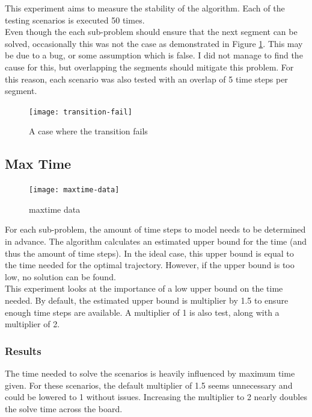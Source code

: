 This experiment aims to measure the stability of the algorithm. Each of the testing scenarios is executed 50 times. \\

Even though the each sub-problem should ensure that the next segment can be solved, occasionally this was not the case as demonstrated in Figure \ref{fig:transition-fail}. This may be due to a bug, or some assumption which is false. I did not manage to find the cause for this, but overlapping the segments should mitigate this problem. For this reason, each scenario was also tested with an overlap of 5 time steps per segment.
\begin{figure}[]
	\centering
	\texttt{[image: transition-fail]}
	\caption{A case where the transition fails}
	\label{fig:transition-fail}
\end{figure}




\clearpage
\subsection{Max Time}
\begin{figure}[]
	\centering
	\texttt{[image: maxtime-data]}
	\caption{maxtime data}
	\label{fig:maxtime-data}
\end{figure}
For each sub-problem, the amount of time steps to model needs to be determined in advance. The algorithm calculates an estimated upper bound for the time (and thus the amount of time steps). In the ideal case, this upper bound is equal to the time needed for the optimal trajectory. However, if the upper bound is too low, no solution can be found.\\

This experiment looks at the importance of a low upper bound on the time needed. By default, the estimated upper bound is multiplier by 1.5 to ensure enough time steps are available. A multiplier of 1 is also test, along with a multiplier of 2. \\

\subsubsection{Results}
The time needed to solve the scenarios is heavily influenced by maximum time given. For these scenarios, the default multiplier of 1.5 seems unnecessary and could be lowered to 1 without issues. Increasing the multiplier to 2 nearly doubles the solve time across the board.


